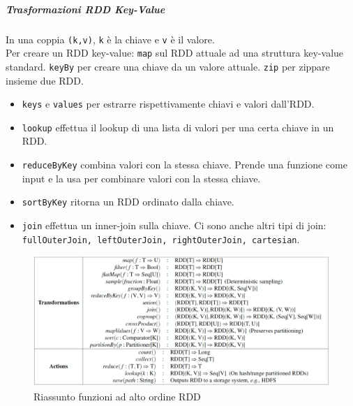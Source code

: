 \documentclass{article}
\begin{document}
\begin{appendices}
\subparagraph{Trasformazioni RDD Key-Value}
In una coppia \texttt{(k,v)}, \texttt{k} è la chiave e \texttt{v} è il valore. \\
Per creare un RDD key-value: \texttt{map} sul RDD attuale ad una struttura key-value standard. \texttt{keyBy} per creare una chiave da un valore attuale. \texttt{zip} per zippare insieme due RDD.
\begin{itemize}
    \item \texttt{keys} e \texttt{values} per estrarre rispettivamente chiavi e valori dall'RDD.
    \item \texttt{lookup} effettua il lookup di una lista di valori per una certa chiave in un RDD.
    \item \texttt{reduceByKey} combina valori con la stessa chiave. Prende una funzione come input e la usa per combinare valori con la stessa chiave.
    \item \texttt{sortByKey} ritorna un RDD ordinato dalla chiave.
    \item \texttt{join} effettua un inner-join sulla chiave. Ci sono anche altri tipi di join: \texttt{fullOuterJoin, leftOuterJoin, rightOuterJoin, cartesian}.
\end{itemize}
\begin{figure}[H]
    \centering
    \includegraphics[scale=0.3]{img/rdd funzioni alto ordine.png}
    \caption{Riassunto funzioni ad alto ordine RDD}
\end{figure}\noindent


\end{appendices}
\end{document}
